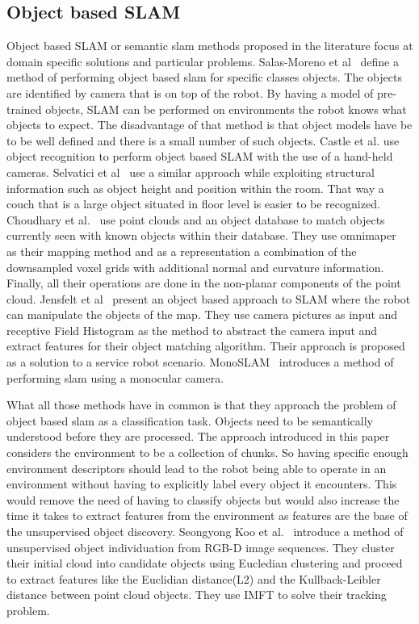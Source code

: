 \documentclass[twoside,hidelinks]{article}
\begin{document}
\subsection{Object based SLAM}
Object based SLAM or semantic slam methods proposed in the literature focus at domain specific solutions and particular problems. Salas-Moreno et al~\cite{slam++} define a method of performing object based slam for specific classes objects. The objects are identified by camera that is on top of the robot. By having a model of pre-trained objects, SLAM can be performed on environments the robot knows what objects to expect. The disadvantage of that method is that object models have be to be well defined and there is a small number of such objects. 
Castle et al. use object recognition to perform object based SLAM with the use of a hand-held cameras. Selvatici et al~\cite{objslam} use a similar approach while exploiting structural information such as object height and position within the room. That way a couch that is a large object situated in floor level is easier to be recognized.
Choudhary et al.~\cite{objectpointslam} use point clouds and an object database to match objects currently seen with known objects within their database. They use omnimaper~\cite{omnimaper} as their mapping method and as a representation a combination of the downsampled  voxel grids with additional normal and curvature information.  Finally, all their operations are done in the non-planar components of the point cloud.
Jensfelt et al~\cite{objslam} present an object based approach to SLAM where the robot can manipulate the objects of the map. They use camera pictures as input and receptive Field Histogram as the method to abstract the camera input and extract features for their object matching algorithm. Their approach is proposed as a solution to a service robot scenario.
MonoSLAM~\cite{monoslam} introduces a method of performing slam using a monocular camera. 

What all those methods have in common is that they approach the problem of object based slam as a classification task. Objects need to be semantically understood before they are processed. The approach introduced in this paper considers the environment to be a collection of chunks. So having specific enough environment descriptors should lead to the robot being able to operate in an environment without having to explicitly label every object it encounters. This would remove the need of having to classify objects but would also increase the time it takes to extract features from the environment as features are the base of the unsupervised object discovery.
Seongyong Koo et al.~\cite{objectDisc} introduce a method of unsupervised object individuation from RGB-D image sequences. They cluster their initial cloud into candidate objects using Eucledian clustering and proceed to extract features like the Euclidian distance(L2) and the Kullback-Leibler distance between point cloud objects. They use IMFT to solve their tracking problem.
\end{document}
